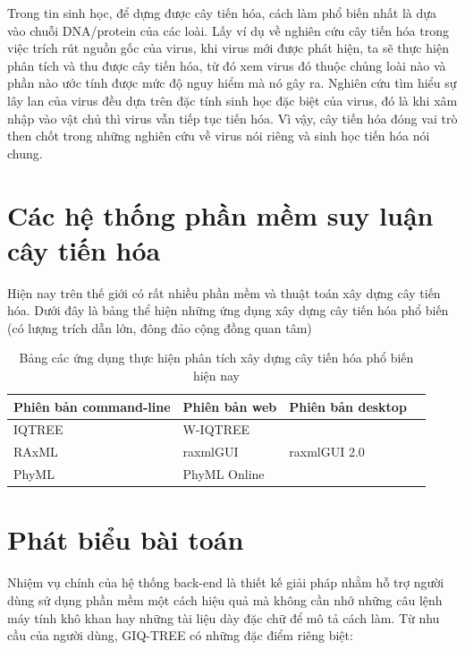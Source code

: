 \documentclass[12pt]{report}
\begin{document}
Trong tin sinh học, để dựng được cây tiến hóa, cách làm phổ biến nhất là dựa vào chuỗi DNA/protein của các loài. Lấy ví dụ về nghiên cứu cây tiến hóa trong việc trích rút nguồn gốc của virus, khi virus mới được phát hiện, ta sẽ thực hiện phân tích và thu được cây tiến hóa, từ đó xem virus đó thuộc chủng loài nào và phần nào ước tính được mức độ nguy hiểm mà nó gây ra. Nghiên cứu tìm hiểu sự lây lan của virus đều dựa trên đặc tính sinh học đặc biệt của virus, đó là khi xâm nhập vào vật chủ thì virus vẫn tiếp tục tiến hóa. Vì vậy, cây tiến hóa đóng vai trò then chốt trong những nghiên cứu về virus nói riêng và sinh học tiến hóa nói chung. 

\section{Các hệ thống phần mềm suy luận cây tiến hóa }
Hiện nay trên thế giới có rất nhiều phần mềm và thuật toán xây dựng cây tiến hóa. Dưới đây là bảng thể hiện những ứng dụng xây dựng cây tiến hóa phổ biến (có lượng trích dẫn lớn, đông đảo cộng đồng quan tâm)

\begin{table}[h]
	\centering
	\caption{Bảng các ứng dụng thực hiện phân tích xây dựng cây tiến hóa phổ biến hiện nay}
	\label{tbl:table1.1}
	\begin{tabular}{|p{3cm}|l|l|l|}
		\hline
		\textbf{Phiên bản command-line} & \textbf{Phiên bản web} & \textbf{Phiên bản desktop} \\ \hline
		IQTREE \cite{cia-3}              & W-IQTREE \cite{cia-4}        &                                  \\ \hline
		RAxML \cite{cia-5}             & raxmlGUI \cite{cia-6}      &             raxmlGUI 2.0 \cite{cia-7}                    \\ \hline
		PhyML \cite{cia-8}             & PhyML Online \cite{cia-9}    &                                  \\ \hline
	\end{tabular}
\end{table}

\section{Phát biểu bài toán}
Nhiệm vụ chính của hệ thống back-end là thiết kế giải pháp nhằm hỗ trợ người dùng sử dụng phần mềm một cách hiệu quả mà không cần nhớ những câu lệnh máy tính khô khan hay những tài liệu dày đặc chữ để mô tả cách làm. Từ nhu cầu của người dùng, GIQ-TREE có những đặc điểm riêng biệt:
\end{document}
